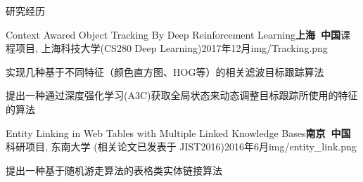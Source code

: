 \documentclass{resume_ch} %
\begin{document}
\begin{rSection}{研究经历}
\begin{rSubsection}{Context Awared Object Tracking By Deep Reinforcement Learning}{\bf 上海\ 中国}{课程项目, 上海科技大学(CS280 Deep Learning)}{2017年12月}{img/Tracking.png}
    \item 实现几种基于不同特征（颜色直方图、HOG等）的相关滤波目标跟踪算法
    \item 提出一种通过深度强化学习(A3C)获取全局状态来动态调整目标跟踪所使用的特征的算法
\end{rSubsection}

\begin{rSubsection}{Entity Linking in Web Tables with Multiple Linked Knowledge Bases}{\bf 南京\ 中国}{科研项目, 东南大学 (相关论文已发表于 JIST2016)}{2016年6月}{img/entity_link.png}
    \item 提出一种基于随机游走算法的表格类实体链接算法
\end{rSubsection}
        
\end{rSection} 
\end{document}
